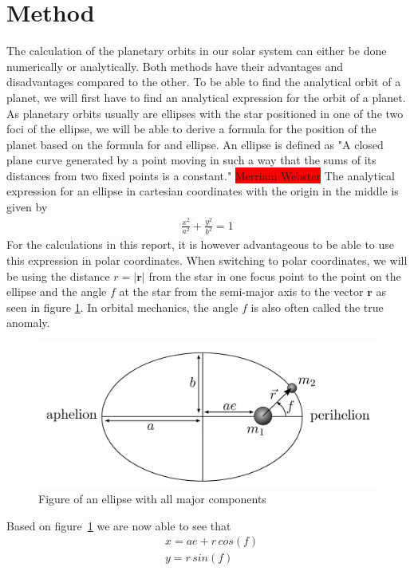 \documentclass[reprint,english,notitlepage]{revtex4-2}
\begin{document}
\section{Method}
The calculation of the planetary orbits in our solar system can either be done numerically or analytically.
Both methods have their advantages and disadvantages compared to the other.
To be able to find the analytical orbit of a planet, we will first have to find an analytical expression for the orbit of a planet.
As planetary orbits usually are ellipses with the star positioned in one of the two foci of the ellipse, we will be able to derive a formula for the position of the planet based on the formula for and ellipse.
An ellipse is defined as "A closed plane curve generated by a point moving in such a way that the sums of its distances from two fixed points is a constant." \colorbox{red}{Merriam Webster}
The analytical expression for an ellipse in cartesian coordinates with the origin in the middle is given by
\begin{align}
    \frac{x^2}{a^2} + \frac{y^2}{b^2} = 1 \label{ellipse_analytic_cart}
\end{align}
For the calculations in this report, it is however advantageous to be able to use this expression in polar coordinates.
When switching to polar coordinates, we will be using the distance $r = |\textbf{r}|$ from the star in one focus point to the point on the ellipse and the angle $f$ at the star from the semi-major axis to the vector $\textbf{r}$ as seen in figure \ref{fig:Ellipse_fig}.
In orbital mechanics, the angle $f$ is also often called the true anomaly.
\begin{figure}[h]
	\centering
	\includegraphics[scale=0.3]{Figures/Ellipse}
	\caption{Figure of an ellipse with all major components}\label{fig:Ellipse_fig}
\end{figure}
Based on figure~\ref{fig:Ellipse_fig} we are now able to see that
\begin{align}
    &x = ae + r\,cos(f) \label{x_ellipse}\\
	&y = r\,sin(f) \label{y_ellipse}
\end{align}
\end{document}
